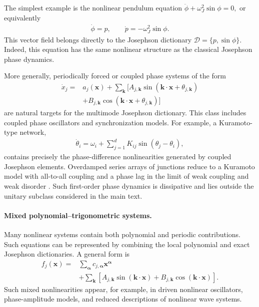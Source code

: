 \documentclass[pra,twocolumn,superscriptaddress,nofootinbib,floatfix]{revtex4-2}
\theoremstyle{remark}
\begin{document}
The simplest example is the nonlinear pendulum equation
\(\ddot\phi+\omega_J^2\sin\phi=0,\)
or equivalently
\begin{align}
\dot\phi = p,\qquad\dot p =-\omega_J^2\sin\phi.
\end{align}
This vector field belongs directly to the Josephson dictionary
\(\mathcal D=\{p,\sin\phi\}.\)
Indeed, this equation has the same nonlinear structure as the classical Josephson phase dynamics.

More generally, periodically forced or coupled phase systems of the form
\begin{align}
\dot x_j={}&a_j(\mathbf x)+\sum_{\mathbf k}\Big[A_{j,\mathbf k}\sin(\mathbf k\cdot\mathbf x+\theta_{j,\mathbf k})\nonumber\\
&+B_{j,\mathbf k}\cos(\mathbf k\cdot\mathbf x+\theta_{j,\mathbf k})\Big]
\label{eq:fourier-vector-field}
\end{align}
are natural targets for the multimode Josephson dictionary. This class includes coupled phase oscillators and synchronization models. For example, a Kuramoto-type network,
\begin{align}
\dot\theta_i=\omega_i+\sum_{j=1}^{d}K_{ij}\sin(\theta_j-\theta_i),
\label{eq:kuramoto}
\end{align}
contains precisely the phase-difference nonlinearities generated by coupled Josephson elements. Overdamped series arrays of junctions reduce to a Kuramoto model with all-to-all coupling and a phase lag in the limit of weak coupling and weak disorder \cite{Wiesenfeld1996JJKuramoto}. Such first-order phase dynamics is dissipative and lies outside the unitary subclass considered in the main text.

\paragraph{Mixed polynomial--trigonometric systems.}
Many nonlinear systems contain both polynomial and periodic contributions. Such equations can be represented by combining the local polynomial and exact Josephson dictionaries. A general form is
\begin{align}
f_j(\mathbf x)={}&\sum_{\boldsymbol{\alpha}}c_{j,\boldsymbol{\alpha}}\mathbf x^{\boldsymbol{\alpha}}\nonumber\\
&+\sum_{\mathbf k}\left[A_{j,\mathbf k}\sin(\mathbf k\cdot\mathbf x)+B_{j,\mathbf k}\cos(\mathbf k\cdot\mathbf x)\right].
\label{eq:mixed-vector-field}
\end{align}
Such mixed nonlinearities appear, for example, in driven nonlinear oscillators, phase-amplitude models, and reduced descriptions of nonlinear wave systems.
\end{document}
